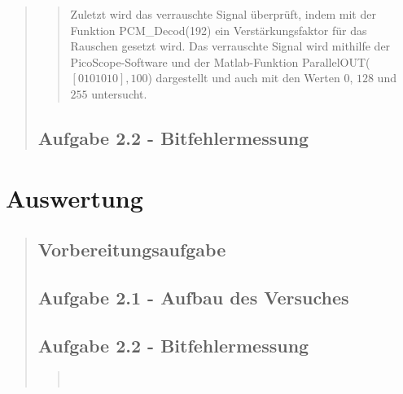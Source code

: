 \begin{quote}
\begin{quote}
        Zuletzt wird das verrauschte Signal überprüft, indem mit der Funktion
        PCM\_Decod(192) ein Verstärkungsfaktor für das Rauschen gesetzt wird.
        Das verrauschte Signal wird mithilfe der PicoScope-Software und der
        Matlab-Funktion ParallelOUT($[0 1 0 1 0 1 0],100$) dargestellt und auch
        mit den Werten $0$, $128$ und $255$ untersucht.
        
        
    \end{quote}%
    
    \subsection{Aufgabe 2.2 - Bitfehlermessung}
    \begin{quote}
    
    
    \end{quote}%

\end{quote}%


    
\section{Auswertung}
\begin{quote}
    
    \subsection{Vorbereitungsaufgabe}
    \begin{quote}
        
    \end{quote}  %
    
    \subsection{Aufgabe 2.1 - Aufbau des Versuches}
    \begin{quote}
        
    \end{quote}  %
    
    \subsection{Aufgabe 2.2 - Bitfehlermessung}
    \begin{quote}
         \\
    \end{quote}  %
         	
\end{quote}%

